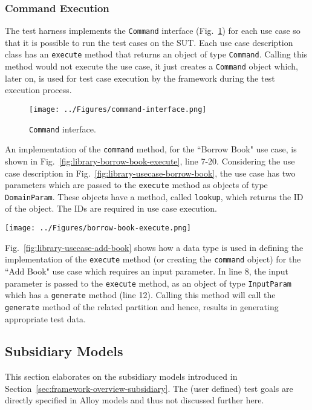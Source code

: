 \subsubsection{Command Execution}
\label{sec:test-harness-command-execution}
The test harness implements the \texttt{Command} interface (Fig.~\ref{fig:test-harness-command-interface}) for each use case so that it is possible to run the test cases on the SUT. Each use case description class has an \texttt{execute} method that returns an object of type \texttt{Command}. Calling this method would not execute the use case, it just creates a \texttt{Command} object which, later on, is used for test case execution by the framework during the test execution process.

\begin{figure}[h]
\centering
\texttt{[image: ../Figures/command-interface.png]}
\caption{\texttt{Command} interface.}
\label{fig:test-harness-command-interface}
\end{figure}

An implementation of the \texttt{command} method, for the ``Borrow Book" use case, is shown in Fig.~\ref{fig:library-borrow-book-execute}, line 7-20. Considering the use case description in Fig.~\ref{fig:library-usecase-borrow-book}, the use case has two parameters which are passed to the \texttt{execute} method as objects of type \texttt{DomainParam}. These objects have a method, called \texttt{lookup}, which returns the ID of the object. The IDs are required in use case execution.

\begin{figure*}[h]
\centering
\texttt{[image: ../Figures/borrow-book-execute.png]}
\caption{Implementation of the \texttt{Command} interface for ``Borrow Book" use case.}
\label{fig:library-borrow-book-execute}
\end{figure*}

Fig.~\ref{fig:library-usecase-add-book} shows how a data type is used in defining the implementation of the \texttt{execute} method (or creating the \texttt{command} object) for the ``Add Book" use case which requires an input parameter.  In line 8, the input parameter is passed to the \texttt{execute} method, as an object of type \texttt{InputParam} which has a \texttt{generate} method (line 12). Calling this method will call the \texttt{generate} method of the related partition and hence, results in generating appropriate test data. 

\subsection{Subsidiary Models}
\label{sec:create-test model-subsidiary-models}
This section elaborates on the subsidiary models introduced in Section~\ref{sec:framework-overview-subsidiary}.
The (user defined) test goals are directly specified in Alloy models and thus not discussed further here.


